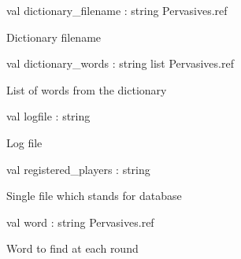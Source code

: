 \documentclass[11pt]{article}
\begin{document}
\label{val:Server.dictionary-underscorefilename}\begin{ocamldoccode}
val dictionary_filename : string Pervasives.ref
\end{ocamldoccode}
\begin{ocamldocdescription}
Dictionary filename


\end{ocamldocdescription}




\label{val:Server.dictionary-underscorewords}\begin{ocamldoccode}
val dictionary_words : string list Pervasives.ref
\end{ocamldoccode}
\begin{ocamldocdescription}
List of words from the dictionary


\end{ocamldocdescription}




\label{val:Server.logfile}\begin{ocamldoccode}
val logfile : string
\end{ocamldoccode}
\begin{ocamldocdescription}
Log file


\end{ocamldocdescription}




\label{val:Server.registered-underscoreplayers}\begin{ocamldoccode}
val registered_players : string
\end{ocamldoccode}
\begin{ocamldocdescription}
Single file which stands for database


\end{ocamldocdescription}




\label{val:Server.word}\begin{ocamldoccode}
val word : string Pervasives.ref
\end{ocamldoccode}
\begin{ocamldocdescription}
Word to find at each round


\end{ocamldocdescription}
\end{document}
